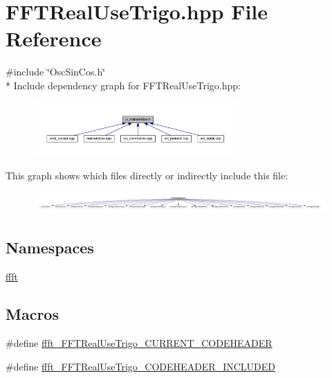 \hypertarget{a00107}{\section{F\+F\+T\+Real\+Use\+Trigo.\+hpp File Reference}
\label{a00107}
}
{\ttfamily \#include \char`\"{}Osc\+Sin\+Cos.\+h\char`\"{}}\\*
Include dependency graph for F\+F\+T\+Real\+Use\+Trigo.\+hpp\+:
\nopagebreak
\begin{figure}[H]
\begin{center}
\leavevmode
\includegraphics[width=222pt]{dc/d28/a00276}
\end{center}
\end{figure}
This graph shows which files directly or indirectly include this file\+:
\nopagebreak
\begin{figure}[H]
\begin{center}
\leavevmode
\includegraphics[width=344pt]{d6/d4b/a00277}
\end{center}
\end{figure}
\subsection*{Namespaces}
\begin{DoxyCompactItemize}
\item 
 \hyperlink{a00142}{ffft}
\end{DoxyCompactItemize}
\subsection*{Macros}
\begin{DoxyCompactItemize}
\item 
\#define \hyperlink{a00107_a0a6588ccc4a0aa953c4e408342130fb7}{ffft\+\_\+\+F\+F\+T\+Real\+Use\+Trigo\+\_\+\+C\+U\+R\+R\+E\+N\+T\+\_\+\+C\+O\+D\+E\+H\+E\+A\+D\+E\+R}
\item 
\#define \hyperlink{a00107_a45d8a651c3a302e4a247c733967e13ed}{ffft\+\_\+\+F\+F\+T\+Real\+Use\+Trigo\+\_\+\+C\+O\+D\+E\+H\+E\+A\+D\+E\+R\+\_\+\+I\+N\+C\+L\+U\+D\+E\+D}
\end{DoxyCompactItemize}


